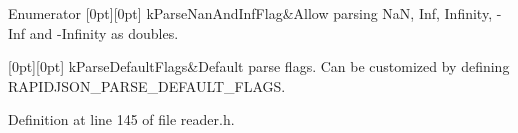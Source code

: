 \begin{DoxyEnumFields}{Enumerator}
[0pt][0pt]{}\mbox{\label{namespacerapidjson_a81379eb4e94a0386d71d15fda882ebc9a857894ab51cafa62956e9c9f0dafc4d8}} 
k\+Parse\+Nan\+And\+Inf\+Flag&Allow parsing NaN, Inf, Infinity, -\/Inf and -\/Infinity as doubles. \\
\hline

[0pt][0pt]{}\mbox{\label{namespacerapidjson_a81379eb4e94a0386d71d15fda882ebc9a5640cb00db7814b7f22be3683dda9835}} 
k\+Parse\+Default\+Flags&Default parse flags. Can be customized by defining R\+A\+P\+I\+D\+J\+S\+O\+N\+\_\+\+P\+A\+R\+S\+E\+\_\+\+D\+E\+F\+A\+U\+L\+T\+\_\+\+F\+L\+A\+GS. \\
\hline

\end{DoxyEnumFields}


Definition at line 145 of file reader.\+h.


